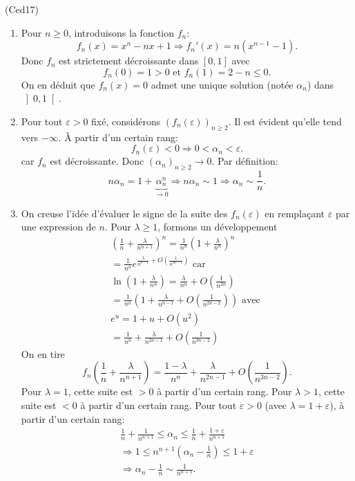 \begin{tiny}(Ced17)\end{tiny} 
\begin{enumerate}
  \item Pour $n\geq 0$, introduisons la fonction $f_n$:
\[
  f_n(x) = x^n -nx +1 \Rightarrow f_n'(x) = n(x^{n-1} - 1) .
\]
Donc $f_n$ est strictement décroissante dans $\left[0,1\right]$ avec 
\[
  f_n(0) = 1 >0 \text{ et } f_n(1) = 2 - n \leq 0.
\]
On en déduit que $f_n(x)= 0$ admet une unique solution (notée $\alpha_n$) dans $\left] 0,1 \right[$.

  \item Pour tout $\varepsilon >0$ fixé, considérons $(f_n(\varepsilon))_{n \geq 2}$. Il est évident qu'elle tend vers $-\infty$.\newline
\`A partir d'un certain rang:
\[
  f_n(\varepsilon) < 0 \Rightarrow 0 < \alpha_n < \varepsilon .
\]
car $f_n$ est décroissante. Donc $(\alpha _{n})_{n\geq 2} \rightarrow 0$.\newline
Par définition:
\[
  n\alpha_n = 1 + \underset{\rightarrow 0}{\underbrace{\alpha_n^n}} \Rightarrow n\alpha_n \sim 1 \Rightarrow \alpha_n\sim \frac{1}{n}.
\]

  \item On creuse l'idée d'évaluer le signe de la suite des $f_n(\varepsilon)$ en remplaçant $\varepsilon$ par une expression de $n$.\newline
Pour $\lambda \geq 1$, formons un développement 
\begin{multline*}
  \left(\frac{1}{n} + \frac{\lambda}{n^{n+1}}\right)^n
  = \frac{1}{n^n}\left( 1 + \frac{\lambda}{n^n}\right)^n\\
  = \frac{1}{n^n} e^{\frac{\lambda}{n^{n-1}} + O(\frac{1}{n^{2n-1}})} \text{ car} \\
          \ln(1+\frac{\lambda}{n^n}) = \frac{\lambda}{n^n} + O(\frac{1}{n^{2n}}) \\
  = \frac{1}{n^n}\left( 1 + \frac{\lambda}{n^{n-1}} + O(\frac{1}{n^{2n-2}})\right) \text{ avec }  \\
  e^u = 1 + u + O(u^2)\\
  = \frac{1}{n^n} + \frac{\lambda}{n^{2n-1}} + O(\frac{1}{n^{3n-2}})
\end{multline*}
On en tire
\[
  f_n\left( \frac{1}{n} + \frac{\lambda}{n^{n+1}}\right)
  = \frac{1-\lambda}{n^n} + \frac{\lambda}{n^{2n-1}} + O(\frac{1}{n^{3n-2}}). 
\]
Pour $\lambda = 1$, cette suite est $>0$ à partir d'un certain rang. Pour $\lambda >1$, cette suite est $<0$ à partir d'un certain rang.\newline
Pour tout $\varepsilon >0$ (avec $\lambda = 1 +\varepsilon$), à partir d'un certain rang:
\begin{multline*}
  \frac{1}{n} + \frac{1}{n^{n+1}} \leq \alpha_n \leq \frac{1}{n} + \frac{1+\varepsilon}{n^{n+1}} \\
  \Rightarrow
  1 \leq n^{n+1} \left( \alpha_n - \frac{1}{n}\right) \leq 1 + \varepsilon \\
  \Rightarrow \alpha_n - \frac{1}{n} \sim \frac{1}{n^{n+1}}.
\end{multline*}


\end{enumerate}
